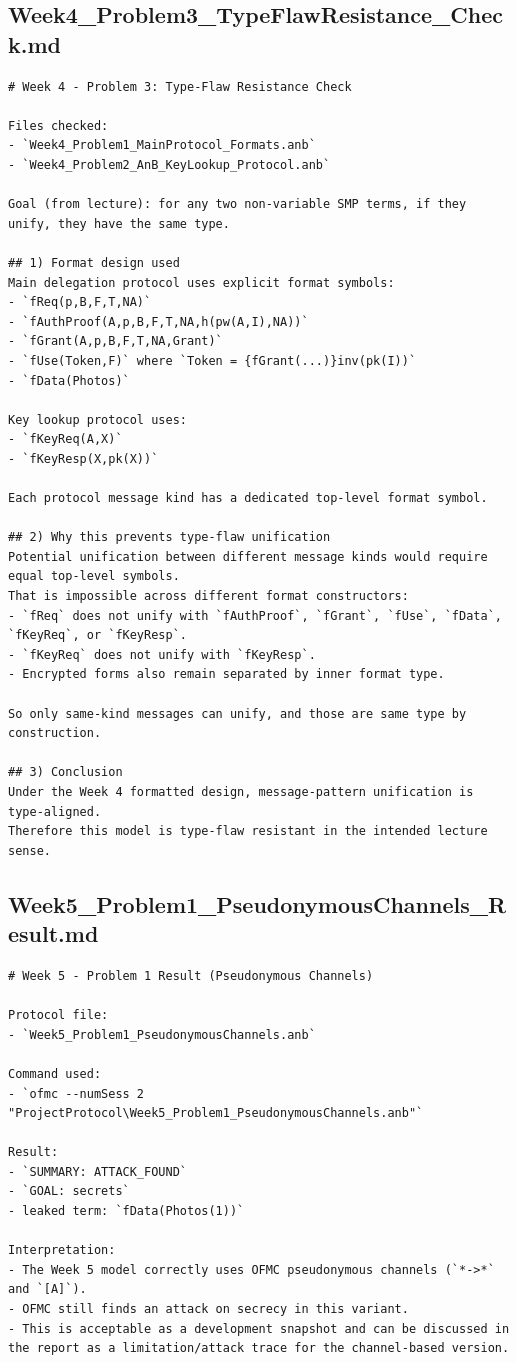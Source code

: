 \documentclass[11pt,a4paper]{article}
\begin{document}
\subsection{Week4\_Problem3\_TypeFlawResistance\_Check.md}
\begin{lstlisting}
# Week 4 - Problem 3: Type-Flaw Resistance Check

Files checked:
- `Week4_Problem1_MainProtocol_Formats.anb`
- `Week4_Problem2_AnB_KeyLookup_Protocol.anb`

Goal (from lecture): for any two non-variable SMP terms, if they unify, they have the same type.

## 1) Format design used
Main delegation protocol uses explicit format symbols:
- `fReq(p,B,F,T,NA)`
- `fAuthProof(A,p,B,F,T,NA,h(pw(A,I),NA))`
- `fGrant(A,p,B,F,T,NA,Grant)`
- `fUse(Token,F)` where `Token = {fGrant(...)}inv(pk(I))`
- `fData(Photos)`

Key lookup protocol uses:
- `fKeyReq(A,X)`
- `fKeyResp(X,pk(X))`

Each protocol message kind has a dedicated top-level format symbol.

## 2) Why this prevents type-flaw unification
Potential unification between different message kinds would require equal top-level symbols.
That is impossible across different format constructors:
- `fReq` does not unify with `fAuthProof`, `fGrant`, `fUse`, `fData`, `fKeyReq`, or `fKeyResp`.
- `fKeyReq` does not unify with `fKeyResp`.
- Encrypted forms also remain separated by inner format type.

So only same-kind messages can unify, and those are same type by construction.

## 3) Conclusion
Under the Week 4 formatted design, message-pattern unification is type-aligned.
Therefore this model is type-flaw resistant in the intended lecture sense.
\end{lstlisting}

\subsection{Week5\_Problem1\_PseudonymousChannels\_Result.md}
\begin{lstlisting}
# Week 5 - Problem 1 Result (Pseudonymous Channels)

Protocol file:
- `Week5_Problem1_PseudonymousChannels.anb`

Command used:
- `ofmc --numSess 2 "ProjectProtocol\Week5_Problem1_PseudonymousChannels.anb"`

Result:
- `SUMMARY: ATTACK_FOUND`
- `GOAL: secrets`
- leaked term: `fData(Photos(1))`

Interpretation:
- The Week 5 model correctly uses OFMC pseudonymous channels (`*->*` and `[A]`).
- OFMC still finds an attack on secrecy in this variant.
- This is acceptable as a development snapshot and can be discussed in the report as a limitation/attack trace for the channel-based version.
\end{lstlisting}
\end{document}
